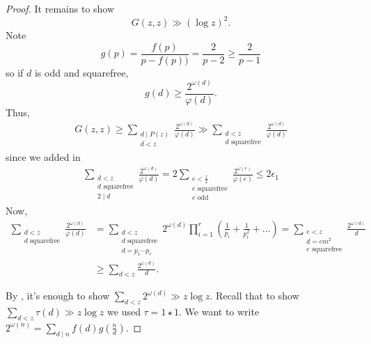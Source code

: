 \documentclass{article}
\newcommand{\1}{\mathbbm{1}}
\begin{document}
\begin{proof}
  \newlec
  It remains to show
  \begin{equation*}
    G(z,z) \gg (\log z)^2.
  \end{equation*}
  Note
  \begin{equation*}
  g(p) = \frac{f(p)}{p-f(p))} = \frac{2}{p-2} \geq \frac{2}{p-1}
  \end{equation*}
  so if $d$ is odd and squarefree,
  \begin{equation*}
    g(d) \geq \frac{2^{\omega(d)}}{\varphi(d)}.
  \end{equation*}
  Thus,
  \begin{align*}
    G(z,z) \geq \sum_{\substack{d \mid P(z) \\ d < z}}
    \frac{2^{\omega(d)}}{\varphi(d)} \gg
    \sum_{\substack{d < z \\ d \text{ squarefree}}}
      \frac{2^{\omega(d)}}{\varphi(d)}
  \end{align*}
  since we added in
  \begin{align*}
    \sum_{\substack{d < z \\ d \text{ squarefree} \\ 2 \mid d}} \frac{2^{\omega(d)}}{\varphi(d)} = 2 \sum_{\substack{e < \frac{z}{2} \\ e \text{ squarefree} \\ e \text{ odd}}} \frac{2^{\omega(e)}}{\varphi(e)} \leq 2 \epsilon_1
  \end{align*}
  Now,
  \begin{align*}
    \sum_{\substack{d < z \\ d \text{ squarefree}}} \frac{2^{\omega(d)}}{\varphi(d)} &= \sum_{\substack{d < z \\ d \text{ squarefree} \\ d = p_1 \dotsm p_r}} 2^{\omega(d)} \prod_{i=1}^r \left(\frac{1}{p_i} + \frac{1}{p_i^2} + \dots\right) = \sum_{\substack{e < z \\ d = em^2 \\ e \text{ squarefree}}} \frac{2^{\omega(d)}}{d} \\
                                                                                   &\geq \sum_{d < z} \frac{2^{\omega(d)}}{d}.
  \end{align*}

  By , it's enough to show $\sum_{d < z} 2^{\omega(d)} \gg z \log z$.
  Recall that to show $\sum_{d < z} \tau(d) \gg z \log z$ we used $\tau = 1 \star 1$.
  We want to write $2^{\omega(n)} = \sum_{d \mid n} f(d) g(\tfrac{n}{d})$.


\end{proof}
\end{document}
